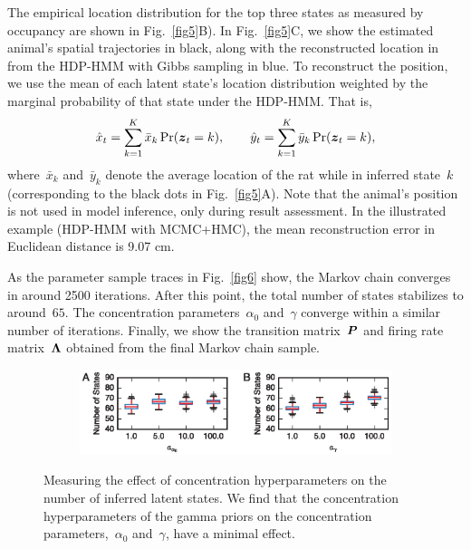 The empirical location distribution for the top three states as
measured by occupancy are shown in Fig.~\ref{fig5}B). In
Fig.~\ref{fig5}C, we show the estimated animal's spatial trajectories
in black, along with the reconstructed location in from the HDP-HMM
with Gibbs sampling in blue. To reconstruct the position, we use the
mean of each latent state's location distribution weighted by the
marginal probability of that state under the HDP-HMM. That is,
\begin{align}
\hat{x}_t = \sum_{k=1}^K \bar{x}_k \Pr(\boldsymbol{z}_t=k), \qquad
\hat{y}_t = \sum_{k=1}^K  \bar{y}_k \Pr(\boldsymbol{z}_t=k),
\end{align}
where~$\bar{x}_k$ and~$\bar{y}_k$ denote the average location of the
rat while in inferred state~$k$ (corresponding to the black dots in
Fig.~\ref{fig5}A). Note that the animal's position is not used in
model inference, only during result assessment. In the illustrated
example (HDP-HMM with MCMC+HMC), the mean reconstruction error in
Euclidean distance is 9.07 cm.



As the parameter sample traces in Fig.~\ref{fig6} show, the Markov
chain converges in around 2500 iterations. After this point, the total
number of states stabilizes to around~$65$.  The concentration
parameters~$\alpha_0$ and~$\gamma$ converge within a similar number of
iterations.  Finally, we show the transition matrix~$\boldsymbol{P}$ and firing
rate matrix~$\boldsymbol{\Lambda}$ obtained from the final Markov chain sample.


\begin{figure}
  \centering
  \begin{subfigure}[t]{5in}
    \includegraphics[width=\textwidth]{figures/ch5/Fig7}
  \end{subfigure}
  \caption[Effect of concentration hyperparameters]{Measuring the
    effect of concentration hyperparameters on the number of inferred
    latent states. We find that the concentration hyperparameters of
    the gamma priors on the concentration parameters,~$\alpha_0$
    and~$\gamma$, have a minimal effect.}
  \label{fig7}
\end{figure}



